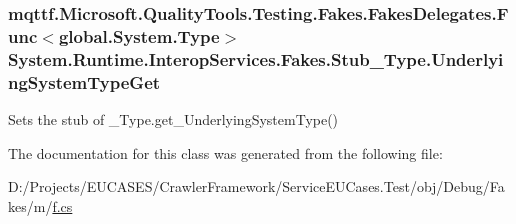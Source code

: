 \hypertarget{class_system_1_1_runtime_1_1_interop_services_1_1_fakes_1_1_stub___type_a2cb02fd06fc980d0ea5a2fe0b29efda8}{
\subsubsection[{Underlying\-System\-Type\-Get}]{\setlength{\rightskip}{0pt plus 5cm}mqttf.\-Microsoft.\-Quality\-Tools.\-Testing.\-Fakes.\-Fakes\-Delegates.\-Func$<$global.\-System.\-Type$>$ System.\-Runtime.\-Interop\-Services.\-Fakes.\-Stub\-\_\-\-Type.\-Underlying\-System\-Type\-Get}}\label{class_system_1_1_runtime_1_1_interop_services_1_1_fakes_1_1_stub___type_a2cb02fd06fc980d0ea5a2fe0b29efda8}


Sets the stub of \-\_\-\-Type.\-get\-\_\-\-Underlying\-System\-Type()



The documentation for this class was generated from the following file\-:\begin{DoxyCompactItemize}
\item 
D\-:/\-Projects/\-E\-U\-C\-A\-S\-E\-S/\-Crawler\-Framework/\-Service\-E\-U\-Cases.\-Test/obj/\-Debug/\-Fakes/m/\hyperlink{m_2f_8cs}{f.\-cs}\end{DoxyCompactItemize}
